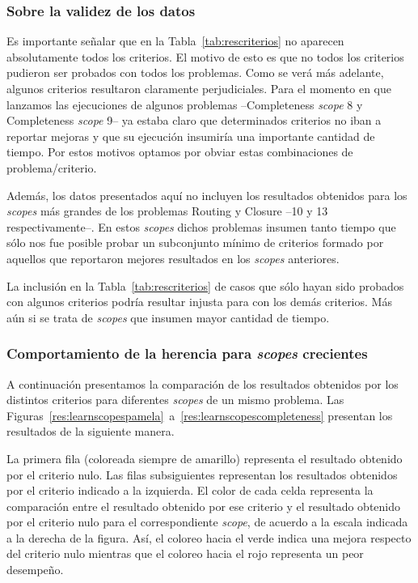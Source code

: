 \subsubsection{Sobre la validez de los datos}

Es importante señalar que en la Tabla~\ref{tab:rescriterios} no aparecen
absolutamente todos los criterios. El motivo de esto es que no todos los
criterios pudieron ser probados con todos los problemas. Como se verá más
adelante, algunos criterios resultaron claramente perjudiciales. Para el
momento en que lanzamos las ejecuciones de algunos problemas --Completeness
\emph{scope} 8 y Completeness \emph{scope} 9-- ya estaba claro que
determinados criterios no iban a reportar mejoras y que su ejecución insumiría
una importante cantidad de tiempo. Por estos motivos optamos por obviar estas
combinaciones de problema/criterio.

Además, los datos presentados aquí no incluyen los resultados obtenidos
para los \emph{scopes} más grandes de los problemas Routing y Closure --10 y
13 respectivamente--. En estos \emph{scopes} dichos problemas insumen tanto
tiempo que sólo nos fue posible probar un subconjunto mínimo de criterios
formado por aquellos que reportaron mejores resultados en los \emph{scopes}
anteriores. 

La inclusión en la Tabla~\ref{tab:rescriterios} de casos que sólo
hayan sido probados con algunos criterios podría resultar injusta para con los
demás criterios. Más aún si se trata de \emph{scopes} que insumen mayor
cantidad de tiempo.

\subsubsection{Comportamiento de la herencia para \emph{scopes} crecientes}

A continuación presentamos la comparación de los resultados obtenidos por los
distintos criterios para diferentes \emph{scopes} de un mismo problema. Las
Figuras~\ref{res:learnscopespamela}~a~\ref{res:learnscopescompleteness}
presentan los resultados de la siguiente manera. 

La primera fila (coloreada siempre de amarillo) representa el resultado
obtenido por el criterio nulo. Las filas subsiguientes representan los
resultados obtenidos por el criterio indicado a la izquierda. El color de cada
celda representa la comparación entre el resultado obtenido por ese criterio y
el resultado obtenido por el criterio nulo para el correspondiente
\emph{scope}, de acuerdo a la escala indicada a la derecha de la figura. Así, el
coloreo hacia el verde indica una mejora respecto del criterio nulo mientras
que el coloreo hacia el rojo representa un peor desempeño.

